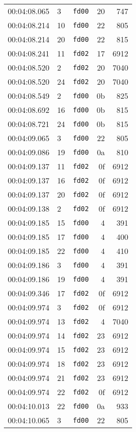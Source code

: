 \documentclass{article}
\begin{document}
\begin{longtable}{lllrr}
00:04:08.065 & 3 & \texttt{fd00} & 20 & 747 \\
00:04:08.214 & 10 & \texttt{fd00} & 22 & 805 \\
00:04:08.214 & 20 & \texttt{fd00} & 22 & 815 \\
00:04:08.241 & 11 & \texttt{fd02} & 17 & 6912 \\
00:04:08.520 & 2 & \texttt{fd02} & 20 & 7040 \\
00:04:08.520 & 24 & \texttt{fd02} & 20 & 7040 \\
00:04:08.549 & 2 & \texttt{fd00} & 0b & 825 \\
00:04:08.692 & 16 & \texttt{fd00} & 0b & 815 \\
00:04:08.721 & 24 & \texttt{fd00} & 0b & 815 \\
00:04:09.065 & 3 & \texttt{fd00} & 22 & 805 \\
00:04:09.086 & 19 & \texttt{fd00} & 0a & 810 \\
00:04:09.137 & 11 & \texttt{fd02} & 0f & 6912 \\
00:04:09.137 & 16 & \texttt{fd02} & 0f & 6912 \\
00:04:09.137 & 20 & \texttt{fd02} & 0f & 6912 \\
00:04:09.138 & 2 & \texttt{fd02} & 0f & 6912 \\
00:04:09.185 & 15 & \texttt{fd00} & 4 & 391 \\
00:04:09.185 & 17 & \texttt{fd00} & 4 & 400 \\
00:04:09.185 & 22 & \texttt{fd00} & 4 & 410 \\
00:04:09.186 & 3 & \texttt{fd00} & 4 & 391 \\
00:04:09.186 & 19 & \texttt{fd00} & 4 & 391 \\
00:04:09.346 & 17 & \texttt{fd02} & 0f & 6912 \\
00:04:09.974 & 3 & \texttt{fd02} & 0f & 6912 \\
00:04:09.974 & 13 & \texttt{fd02} & 4 & 7040 \\
00:04:09.974 & 14 & \texttt{fd02} & 23 & 6912 \\
00:04:09.974 & 15 & \texttt{fd02} & 23 & 6912 \\
00:04:09.974 & 18 & \texttt{fd02} & 23 & 6912 \\
00:04:09.974 & 21 & \texttt{fd02} & 23 & 6912 \\
00:04:09.974 & 22 & \texttt{fd02} & 0f & 6912 \\
00:04:10.013 & 22 & \texttt{fd00} & 0a & 933 \\
00:04:10.065 & 3 & \texttt{fd00} & 22 & 805 \\

\end{longtable}
\end{document}

